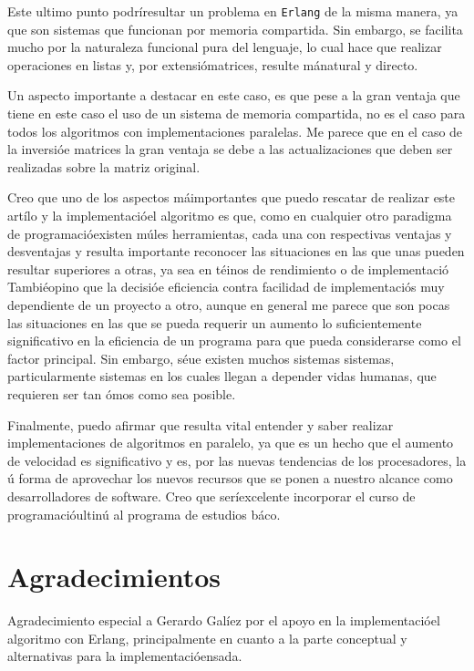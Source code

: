 \documentclass[10pt,letterpaper,oneside]{article}
\begin{document}
{Este ultimo punto podríresultar un problema en \verb!Erlang! de la misma manera, ya que son sistemas que funcionan por memoria compartida. Sin embargo, se facilita mucho por la naturaleza funcional pura del lenguaje, lo cual hace que realizar operaciones en listas y, por extensiómatrices, resulte mánatural y directo.

Un aspecto importante a destacar en este caso, es que pese a la gran ventaja que tiene en este caso el uso de un sistema de memoria compartida, no es el caso para todos los algoritmos con implementaciones paralelas. Me parece que en el caso de la inversióe matrices la gran ventaja se debe a las actualizaciones que deben ser realizadas sobre la matriz original.

Creo que uno de los aspectos máimportantes que puedo rescatar de realizar este artílo y la implementacióel algoritmo es que, como en cualquier otro paradigma de programacióexisten múles herramientas, cada una con respectivas ventajas y desventajas y resulta importante reconocer las situaciones en las que unas pueden resultar superiores a otras, ya sea en téinos de rendimiento o de implementació
Tambiéopino que la decisióe eficiencia contra facilidad de implementaciós muy dependiente de un proyecto a otro, aunque en general me parece que son pocas las situaciones en las que se pueda requerir un aumento lo suficientemente significativo en la eficiencia de un programa para que pueda considerarse como el factor principal. Sin embargo, séue existen muchos sistemas sistemas, particularmente sistemas en los cuales llegan a depender vidas humanas, que requieren ser tan ómos como sea posible.

Finalmente, puedo afirmar que resulta vital entender y saber realizar implementaciones de algoritmos en paralelo, ya que es un hecho que el aumento de velocidad es significativo y es, por las nuevas tendencias de los procesadores, la ú forma de aprovechar los nuevos recursos que se ponen a nuestro alcance como desarrolladores de software. Creo que seríexcelente incorporar el curso de programacióultinú al programa de estudios báco.

\section{Agradecimientos}

Agradecimiento especial a Gerardo Galíez por el apoyo en la implementacióel algoritmo con Erlang, principalmente en cuanto a la parte conceptual y alternativas para la implementacióensada.

}
\end{document}
